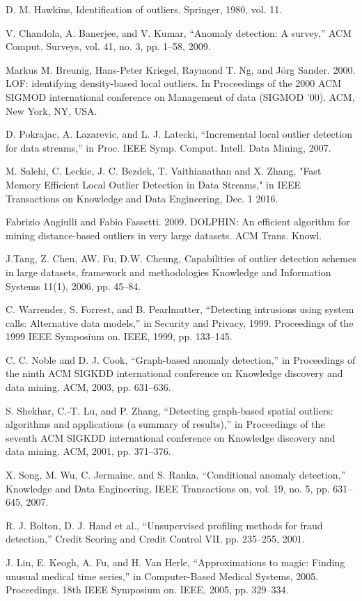 \begin{thebibliography}{9}
	
	 D. M. Hawkins, Identification of outliers. Springer, 1980, vol. 11.
	
	V. Chandola, A. Banerjee, and V. Kumar, “Anomaly detection: A
	survey,” ACM Comput. Surveys, vol. 41, no. 3, pp. 1–58, 2009.
	
	Markus M. Breunig, Hans-Peter Kriegel, Raymond T. Ng, and Jörg Sander. 2000. LOF: identifying density-based local outliers. In Proceedings of the 2000 ACM SIGMOD international conference on Management of data (SIGMOD '00). ACM, New York, NY, USA. 
	
	D. Pokrajac, A. Lazarevic, and L. J. Latecki, “Incremental local outlier
	detection for data streams,” in Proc. IEEE Symp. Comput. Intell.
	Data Mining, 2007.
	
	M. Salehi, C. Leckie, J. C. Bezdek, T. Vaithianathan and X. Zhang, "Fast Memory Efficient Local Outlier Detection in Data Streams," in IEEE Transactions on Knowledge and Data Engineering, Dec. 1 2016.
	
	Fabrizio Angiulli and Fabio Fassetti. 2009. DOLPHIN: An efficient algorithm for mining distance-based outliers in very large datasets. ACM Trans. Knowl.
	
	J.Tang, Z. Chen, AW. Fu, D.W. Cheung, Capabilities of outlier detection schemes in large datasets, framework and methodologies Knowledge and Information Systems 11(1), 2006, pp. 45–84.
	
	C. Warrender, S. Forrest, and B. Pearlmutter, “Detecting intrusions using system calls:
	Alternative data models,” in Security and Privacy, 1999. Proceedings of the 1999 IEEE
	Symposium on. IEEE, 1999, pp. 133–145.
	
	C. C. Noble and D. J. Cook, “Graph-based anomaly detection,” in Proceedings of the ninth ACM
	SIGKDD international conference on Knowledge discovery and data mining. ACM, 2003, pp.
	631–636.
	
	S. Shekhar, C.-T. Lu, and P. Zhang, “Detecting graph-based spatial outliers: algorithms and
	applications (a summary of results),” in Proceedings of the seventh ACM SIGKDD international
	conference on Knowledge discovery and data mining. ACM, 2001, pp. 371–376.
	
	X. Song, M. Wu, C. Jermaine, and S. Ranka, “Conditional anomaly detection,” Knowledge and
	Data Engineering, IEEE Transactions on, vol. 19, no. 5, pp. 631–645, 2007.
	
	R. J. Bolton, D. J. Hand et al., “Unsupervised profiling methods for fraud detection,” Credit
	Scoring and Credit Control VII, pp. 235–255, 2001.
	
	J. Lin, E. Keogh, A. Fu, and H. Van Herle, “Approximations to magic: Finding unusual medical
	time series,” in Computer-Based Medical Systems, 2005. Proceedings. 18th IEEE Symposium on.
	IEEE, 2005, pp. 329–334.
\end{thebibliography}

